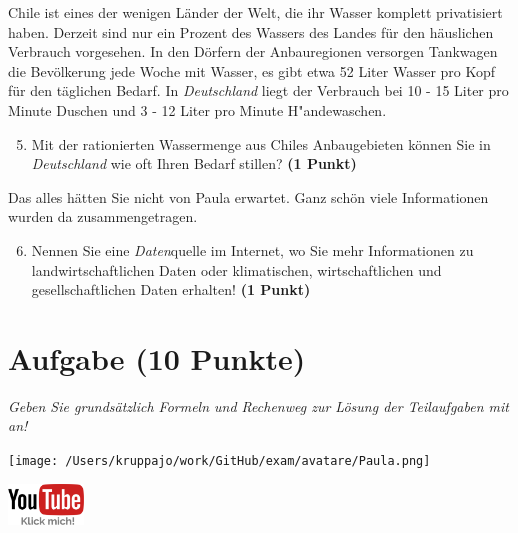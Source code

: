 \documentclass[a4paper, 9pt]{scrartcl}\usepackage[]{graphicx}\usepackage[]{xcolor}
\begin{document}
Chile ist eines der wenigen Länder der Welt, die ihr Wasser komplett privatisiert haben. Derzeit sind nur ein Prozent des Wassers des Landes für den häuslichen Verbrauch vorgesehen. In den Dörfern der Anbauregionen versorgen Tankwagen die Bevölkerung jede Woche mit Wasser, es gibt etwa 52 Liter Wasser pro Kopf für den täglichen Bedarf. In \textit{Deutschland} liegt der Verbrauch bei 10 - 15 Liter pro Minute Duschen und 3 - 12 Liter pro Minute H{"a}ndewaschen.

\begin{enumerate}
  \setcounter{enumi}{4}
\item Mit der rationierten Wassermenge aus Chiles Anbaugebieten können Sie in \textit{Deutschland} wie oft Ihren Bedarf stillen? \textbf{(1 Punkt)}
\end{enumerate}

Das alles hätten Sie nicht von Paula erwartet. Ganz schön viele Informationen wurden da zusammengetragen.

\begin{enumerate}
  \setcounter{enumi}{5}  
  \item Nennen Sie eine \textit{Daten}quelle im Internet, wo Sie mehr Informationen zu landwirtschaftlichen Daten oder klimatischen, wirtschaftlichen und gesellschaftlichen Daten erhalten! \textbf{(1 Punkt)}
\end{enumerate} 
\clearpage

\section{Aufgabe \hfill (10 Punkte)}

\textit{Geben Sie grundsätzlich Formeln und Rechenweg zur Lösung der Teilaufgaben mit an!} \\[1Ex]
 

 
\begin{minipage}[t]{0.5\textwidth}
\texttt{[image: /Users/kruppajo/work/GitHub/exam/avatare/Paula.png]}
\end{minipage}
\begin{minipage}[t]{0.5\textwidth}
\hfill
\href{https://youtu.be/WZSxntiNF8s}{\includegraphics[width = 2cm]{img/youtube}}
\end{minipage}
\end{document}

